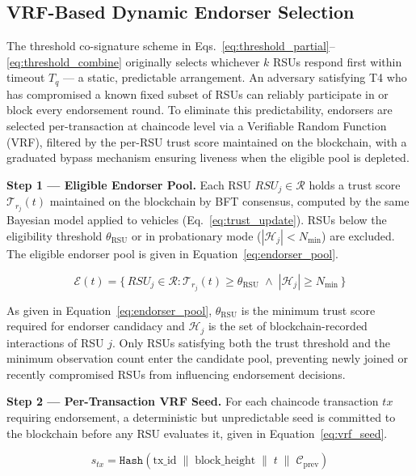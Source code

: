 \documentclass[12pt, a4paper]{report}
\newcommand{\mypar}{\vspace{0.8em}\noindent}
\begin{document}
\subsection{VRF-Based Dynamic Endorser Selection}
\label{sec:endorser_selection}

The threshold co-signature scheme in
Eqs.~\eqref{eq:threshold_partial}--\eqref{eq:threshold_combine}
originally selects whichever $k$ RSUs respond first within timeout
$T_q$ — a static, predictable arrangement. An adversary satisfying
T4 who has compromised a known fixed subset of RSUs can reliably
participate in or block every endorsement round. To eliminate this
predictability, endorsers are selected per-transaction at chaincode
level via a Verifiable Random Function (VRF), filtered by the
per-RSU trust score maintained on the blockchain, with a graduated
bypass mechanism ensuring liveness when the eligible pool is
depleted.

\mypar
\textbf{Step 1 — Eligible Endorser Pool.}
Each RSU $RSU_j \in \mathcal{R}$ holds a trust score
$\mathcal{T}_{r_j}(t)$ maintained on the blockchain by BFT
consensus, computed by the same Bayesian model applied to vehicles
(Eq.~\eqref{eq:trust_update}). RSUs below the eligibility threshold
$\theta_{\text{RSU}}$ or in probationary mode ($|\mathcal{H}_j| <
N_{\min}$) are excluded. The eligible endorser pool is given in
Equation~\eqref{eq:endorser_pool}.

\begin{equation}
\label{eq:endorser_pool}
\mathcal{E}(t) =
\bigl\{\,RSU_j \in \mathcal{R} :
\mathcal{T}_{r_j}(t) \geq \theta_{\text{RSU}}
\;\wedge\;
|\mathcal{H}_j| \geq N_{\min}
\,\bigr\}
\end{equation}

As given in Equation~\eqref{eq:endorser_pool}, $\theta_{\text{RSU}}$
is the minimum trust score required for endorser candidacy and
$\mathcal{H}_j$ is the set of blockchain-recorded interactions
of RSU $j$. Only RSUs satisfying both the trust threshold and the
minimum observation count enter the candidate pool, preventing
newly joined or recently compromised RSUs from influencing
endorsement decisions.

\mypar
\textbf{Step 2 — Per-Transaction VRF Seed.}
For each chaincode transaction $tx$ requiring endorsement, a
deterministic but unpredictable seed is committed to the blockchain
before any RSU evaluates it, given in
Equation~\eqref{eq:vrf_seed}.

\begin{equation}
\label{eq:vrf_seed}
s_{tx} =
\texttt{Hash}\!\left(
\text{tx\_id}
\;\|\;
\text{block\_height}
\;\|\;
t
\;\|\;
\mathcal{C}_{\text{prev}}
\right)
\end{equation}
\end{document}
